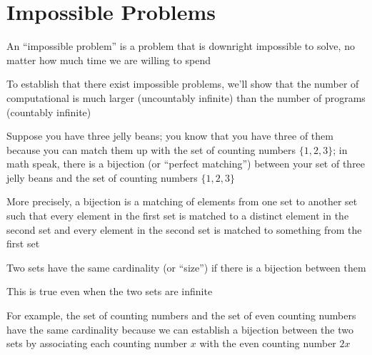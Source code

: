 \documentclass[8pt,a4paper,compress]{beamer}
\begin{document}
\section{Impossible Problems}
\begin{frame}[fragile]
\pause

An ``impossible problem'' is a problem that is downright impossible to solve, no matter how much time we are willing to spend

\pause
\bigskip

To establish that there exist impossible problems, we'll show that the number of computational is much larger (uncountably infinite) than the number of programs (countably infinite)

\pause
\bigskip

Suppose you have three jelly beans; you know that you have three of them because you can match them up with the set of counting numbers $\{1,2,3\}$; in math speak, there is a bijection (or ``perfect matching'') between your set of three jelly beans and the set of counting numbers $\{1,2,3\}$

\pause
\bigskip

More precisely, a bijection is a matching of elements from one set to another set such that every element in the first set is matched to a distinct element in the second set and every element in the second set is matched to something from the first set

\pause
\bigskip

Two sets have the same cardinality (or ``size'') if there is a bijection between them

\pause
\bigskip

This is true even when the two sets are infinite

\pause
\bigskip

For example, the set of counting numbers and the set of even counting numbers have the same cardinality because we can establish a bijection between the two sets by associating each counting number $x$ with the even counting number $2x$
\end{frame}
\end{document}

